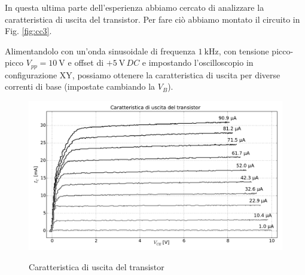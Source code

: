 In questa ultima parte dell'esperienza abbiamo cercato di analizzare la caratteristica di uscita del transistor.
Per fare ciò abbiamo montato il circuito in Fig. \ref{fig:cc3}.

Alimentandolo con un'onda sinusoidale di frequenza $\SI{1}{\kilo\hertz}$, con tensione picco-picco $V_{pp} = \SI{10}{\volt}$ e offset di $+\SI{5}{\volt} \, DC$ e impostando l'oscilloscopio in configurazione XY, possiamo ottenere la caratteristica di uscita per diverse correnti di base (impostate cambiando la $V_B$).

\begin{figure}[h]
\centering
	\caption{Caratteristica di uscita del transistor}
	\includegraphics[scale=0.45]{xy.pdf}
	\label{fig:xy}
\end{figure}